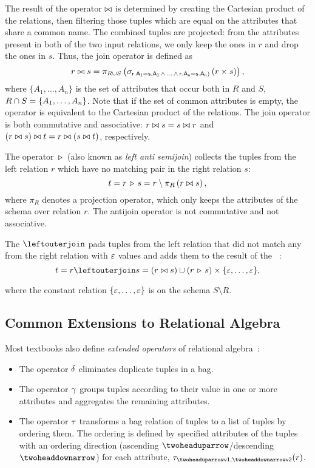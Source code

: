 The result of the \jointext operator $\bowtie$ is determined by creating the Cartesian product of the relations, then filtering those tuples which are equal on the attributes that share a common name. The combined tuples are projected: from the attributes present in both of the two input relations, we only keep the ones in $r$ and drop the ones in $s$. Thus, the join operator is defined as
$$r \bowtie s = \pi_{R \cup S} \left(\sigma_{\mathsf{r.A_1 = s.A_1\,\land\,\ldots\,\land\,r.A_n = s.A_n)}} \left(r \times s\right) \right),$$
where $ \{ A_1, \ldots, A_n \} $ is the set of attributes that occur both in $R$ and $S$, \ie $ R \cap S = \{ A_1, \ldots, A_n \} $. Note that if the set of common attributes is empty, the \jointext operator is equivalent to the Cartesian product of the relations.
The join operator is both commutative and associative: $r \bowtie s = s \bowtie r$ and $(r \bowtie s) \bowtie t = r \bowtie (s \bowtie t)$, respectively.

The \antijointext operator $\, \triangleright \,$ (also known as \emph{left anti semijoin}) collects the tuples from the left relation $r$ which have no matching pair in the right relation $s$:
$$ t = r \, \triangleright \, s = r \setminus \pi_{R} \left(r \bowtie s\right), $$
where $\pi_{R}$ denotes a projection operator, which only keeps the attributes of the schema over relation $r$. The antijoin operator is not commutative and not associative.

The \leftouterjointext $\myleftouterjoin$ pads tuples from the left relation that did not match any from the right relation with $\varepsilon$ values and adds them to the result of the \jointext~\cite{DBLP:books/daglib/0015084}:
$$ t = r \myleftouterjoin s = (r \join s) \union (r \antijoin s) \cartesianproductop \{\relnull, \ldots, \relnull\}, $$

where the constant relation $\{\varepsilon, \ldots, \varepsilon\}$ is on the schema $S \setminus R$.

\subsection{Common Extensions to Relational Algebra}

Most textbooks also define \emph{extended operators} of relational algebra~\cite{DBLP:books/daglib/0020812}:

\begin{itemize}
	\item The \duplicateeliminationtext operator $\delta$ eliminates duplicate tuples in a bag.
	\item The \groupingtext operator $\gamma$ groups tuples according to their value in one or more attributes and aggregates the remaining attributes. %
	\item The \sorttext operator $\tau$ transforms a bag relation of tuples to a list of tuples by ordering them. The ordering is defined by specified attributes of the tuples with an ordering direction (ascending $\asc$/descending $\desc$) for each attribute, \eg $\sortop_{\asc \atom{v1}, \desc \atom{v2}} (r)$.
\end{itemize}

